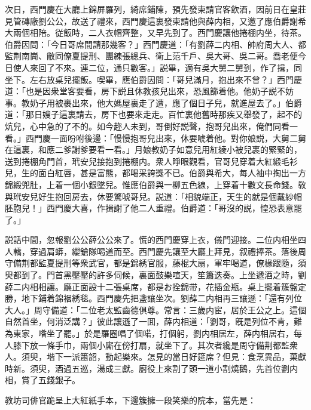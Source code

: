 次日，西門慶在大廳上錦屏羅列，綺席鋪陳，預先發柬請官客飲酒，因前日在皇莊見管磚廠劉公公，故送了禮來，西門慶這裏發柬請他與薛内相，又邀了應伯爵謝希大兩個相陪。従飯時，二人衣帽齊整，又早先到了。西門慶讓他捲棚内坐，待茶。伯爵因問：「今日哥席間請那幾客？」西門慶道：「有劉薛二内相、帥府周大人、都監荆南崗、敝同僚夏提刑、團練張總兵、衛上范千戶、吳大哥、吳二哥。喬老便今日使人來回了不來。連二位，通只數客。」説畢，適有吳大舅二舅到，作了揖，同坐下。左右放桌兒擺飯。喫畢，應伯爵因問：「哥兒滿月，抱出來不曾？」西門慶道：「也是因衆堂客要看，房下説且休教孩兒出來，恐風篩着他。他奶子説不妨事。教奶子用被裹出來，他大媽屋裏走了遭，應了個日子兒，就進屋去了。」伯爵道：「那日嫂子這裏請去，房下也要來走走。百忙裏他舊時那疾又舉發了，起不的炕兒，心中急的了不的。如今趂人未到，哥倒好説聲，抱哥兒出來，俺們同看一看。」西門慶一面吩咐後邊：「慢慢抱哥兒出來，休要唬着他。對你娘説，大舅二舅在這裏，和應二爹謝爹要看一看。」月娘教奶子如意兒用紅綾小被兒裹的緊緊的，送到捲棚角門首，玳安兒接抱到捲棚内。衆人睜眼觀看，官哥兒穿着大紅緞毛衫兒，生的面白紅唇，甚是富態，都喝采誇獎不已。伯爵與希大，每人袖中掏出一方錦緞兜肚，上着一個小銀墜兒。惟應伯爵與一柳五色線，上穿着十數文長命錢。敎與玳安兒好生抱回房去，休要驚唬哥兒。説道：「相貌端正，天生的就是個戴紗帽胚胞兒！」西門慶大喜，作揖謝了他二人重禮。伯爵道：「哥沒的説，惶恐表意罷了。」

説話中間，忽報劉公公薛公公來了。慌的西門慶穿上衣，儀門迎接。二位内相坐四人轎，穿過肩蟒，纓鎗隊喝道而至。西門慶先讓至大廳上拜見，叙禮捧茶。落後周守備荆都監夏提刑等衆武官，都是錦綉官服，藤棍大扇，軍牢喝道，僚椽跟隨，須臾都到了。門首黑壓壓的許多伺候，裏面鼓樂喧天，笙簫迭奏。上坐遞酒之時，劉薛二内相相讓。廳正面設十二張桌席，都是お拴錦带，花插金瓶。桌上擺着簇盤定勝，地下鋪着錦裀綉毯。西門慶先把盞讓坐次。劉薛二内相再三讓遜：「還有列位大人。」周守備道：「二位老太監齒德俱尊。常言：三歲内宦，居於王公之上。這個自然首坐，何消泛講？」彼此讓遜了一囬，薛内相道：「劉哥，旣是列位不肯，難為東家，喒坐了罷。」於是羅圈唱了個喏，打個躬，劉内相居左，薛内相居右，每人膝下放一條手巾，兩個小廝在傍打扇，就坐下了。其次者纔是周守備荆都監衆人。須臾，堦下一派簫韶，動起樂來。怎見的當日好筵席？但見：食烹異品，菓獻時新。須臾，酒過五巡，湯成三獻。廚役上來割了頭一道小割燒鵝，先首位劉内相，賞了五錢銀子。

教坊司俳官跪呈上大紅紙手本，下邊簇擁一段笑樂的院本，當先是：

